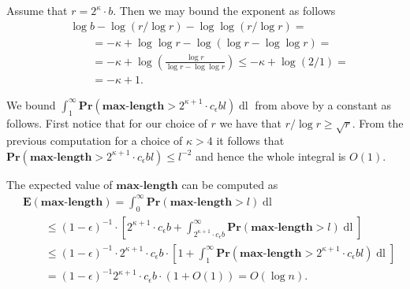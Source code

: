 \documentclass[12pt,notitlepage]{report}
\theoremstyle{definition}
\theoremstyle{plain}
\newcommand{\Prob}[1]{\mathbf{Pr}\left(#1\right)}
\newcommand{\Expect}[1]{\mathbf{E}\left(#1\right)}
\newcommand{\maxlength}{\mathbf{max\mbox{-}length}}
\begin{document}
Assume that $r = 2^{\kappa} \cdot b$. Then we may bound the exponent as follows
\[
\begin{split}
& \log b - \log (r / \log r) - \log \log (r / \log r) = \\
& \qquad = -\kappa + \log \log r - \log (\log r - \log \log r) = \\
& \qquad = -\kappa + \log \left(\frac{\log r}{\log r - \log \log r}\right) \leq -\kappa + \log (2 / 1) = \\
& \qquad = -\kappa + 1.
\end{split}
\]

We bound $\int_{1}^{\infty} \Prob{\maxlength > 2^{\kappa + 1} \cdot c_\epsilon bl} \operatorname{dl}$ from above by a constant as follows.
First notice that for our choice of $r$ we have that $r/\log r \geq \sqrt{r}$. From the previous computation for a choice of $\kappa > 4$ it follows that
$\Prob{\maxlength > 2^{\kappa + 1} \cdot c_\epsilon bl} \leq l^{-2}$ and hence the whole integral is $O(1)$.

The expected value of $\maxlength$ can be computed as
\[
\begin{split}
& \Expect{\maxlength} = \displaystyle\int_{0}^{\infty} \Prob{\maxlength > l} \operatorname{dl} \\
	& \qquad \leq (1 - \epsilon)^{-1} \cdot \left[2^{\kappa + 1} \cdot c_\epsilon b + \displaystyle\int_{2^{\kappa + 1} \cdot c_\epsilon b}^{\infty} \Prob{\maxlength > l} \operatorname{dl}\right] \\
	& \qquad \leq (1 - \epsilon)^{-1} \cdot 2^{\kappa + 1} \cdot c_\epsilon b \cdot \left[1 + \displaystyle\int_{1}^{\infty} \Prob{\maxlength > 2^{\kappa + 1} \cdot c_\epsilon bl} \operatorname{dl}\right] \\
	& \qquad = (1 - \epsilon)^{-1} 2^{\kappa + 1} \cdot c_\epsilon b \cdot (1 + O(1)) = O(\log n).
\end{split}
\]
\end{document}
